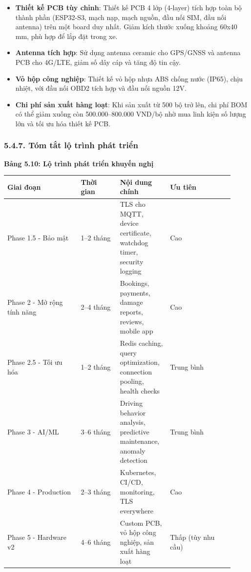 \documentclass[13pt,a4paper]{extarticle}
\newcounter{none} %
\newcommand{\thesislongtableorignewline}{}
\let\thesislongtableorignewline\\
\renewcommand{\\}{\thesislongtableorignewline\hline}%
\let\\\thesislongtableorignewline
\newcommand{\thesistabletitle}[1]{%
  \begin{center}\textbf{#1}\end{center}%
}
\providecommand{\tightlist}{%
  \setlength{\itemsep}{0pt}\setlength{\parskip}{0pt}}
\begin{document}
\begin{itemize}
\tightlist
\item
  \textbf{Thiết kế PCB tùy chỉnh}: Thiết kế PCB 4 lớp (4-layer) tích hợp
  toàn bộ thành phần (ESP32-S3, mạch nạp, mạch nguồn, đầu nối SIM, đầu
  nối antenna) trên một board duy nhất. Giảm kích thước xuống khoảng
  60x40 mm, phù hợp để lắp đặt trong xe.
\item
  \textbf{Antenna tích hợp}: Sử dụng antenna ceramic cho GPS/GNSS và
  antenna PCB cho 4G/LTE, giảm số dây cáp và tăng độ tin cậy.
\item
  \textbf{Vỏ hộp công nghiệp}: Thiết kế vỏ hộp nhựa ABS chống nước
  (IP65), chịu nhiệt, với đầu nối OBD2 tích hợp và đầu nối nguồn 12V.
\item
  \textbf{Chi phí sản xuất hàng loạt}: Khi sản xuất từ 500 bộ trở lên,
  chi phí BOM có thể giảm xuống còn 500.000--800.000 VND/bộ nhờ mua linh
  kiện số lượng lớn và tối ưu hóa thiết kế PCB.
\end{itemize}

\subsubsection{5.4.7. Tóm tắt lộ trình phát
triển}\label{547-tuxf3m-tux1eaft-lux1ed9-truxecnh-phuxe1t-triux1ec3n}

\thesistabletitle{Bảng 5.10: Lộ trình phát triển khuyến nghị}

{\def\LTcaptype{none} %
\begin{longtable}{|p{0.30\linewidth}|p{0.16\linewidth}|p{0.20\linewidth}|p{0.26\linewidth}|}
\hline \textbf{Giai đoạn} & \textbf{Thời gian} & \textbf{Nội dung chính} & \textbf{Ưu tiên} \\
\hline
\endhead
\hline
\endlastfoot
Phase 1.5 - Bảo mật & 1--2 tháng & TLS cho MQTT, device certificate,
watchdog timer, security logging & Cao \\
Phase 2 - Mở rộng tính năng & 2--4 tháng & Bookings, payments, damage
reports, reviews, mobile app & Cao \\
Phase 2.5 - Tối ưu hóa & 1--2 tháng & Redis caching, query optimization,
connection pooling, health checks & Trung bình \\
Phase 3 - AI/ML & 3--6 tháng & Driving behavior analysis, predictive
maintenance, anomaly detection & Trung bình \\
Phase 4 - Production & 2--3 tháng & Kubernetes, CI/CD, monitoring, TLS
everywhere & Cao \\
Phase 5 - Hardware v2 & 4--6 tháng & Custom PCB, vỏ hộp công nghiệp, sản
xuất hàng loạt & Thấp (tùy nhu cầu) \\
\end{longtable}
}
\end{document}

